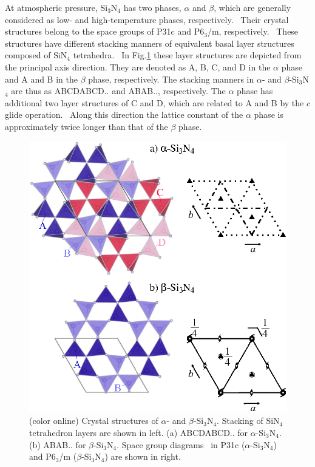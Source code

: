 \documentclass[twocolumn,amsmath,amssymb,a4paper,prb,superscriptaddress,floatfix]{revtex4-1}
\begin{document}
At atmospheric pressure, Si$_3$N$_4$ has two phases, $\alpha$ and
$\beta$, which are generally considered as low- and high-temperature phases,
respectively.~\cite{zhou,hirosaki,riley} Their crystal structures belong to the
space groups of P31c and P6$_3$/m, respectively.~\cite{yashima,boulay} These
structures have different stacking manners of equivalent basal layer structures
composed of SiN$_4$ tetrahedra.~\cite{hampshire} In Fig.\ref{fig:Fig1_cryst}
these layer structures are depicted from the principal axis direction. They are
denoted as A, B, C, and D in the $\alpha$ phase and A and B in the $\beta$
phase, respectively. The stacking manners in $\alpha$- and $\beta$-Si$_3$N$_4$
are thus as ABCDABCD.. and ABAB.., respectively.  The $\alpha$ phase has
additional two layer structures of C and D, which are related to A and B by
the $c$ glide operation.~\cite{hampshire} Along this direction the lattice
constant of the $\alpha$ phase is approximately twice longer than that of the
$\beta$ phase.
\begin{figure}[ht]
 \begin{center}
  \includegraphics[width=0.90\linewidth]{Fig1_crystal_str2.eps} \caption{(color
  online) Crystal structures of $\alpha$- and $\beta$-Si$_3$N$_4$. Stacking of
  SiN$_4$ tetrahedron layers are shown in left. (a) ABCDABCD.. for
  $\alpha$-Si$_3$N$_4$. (b) ABAB.. for $\beta$-Si$_3$N$_4$.  Space group
  diagrams~\cite{inttableA} in P31c ($\alpha$-Si$_3$N$_4$) and P6$_3$/m ($\beta$-Si$_3$N$_4$)
  are shown in right.}
  \label{fig:Fig1_cryst} 
 \end{center}
\end{figure}
\end{document}
